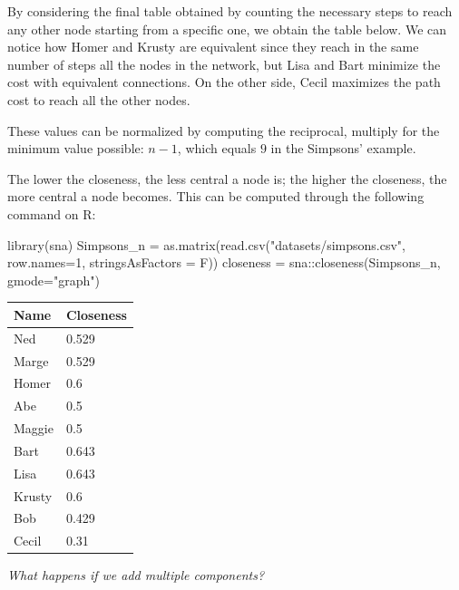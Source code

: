 \documentclass[
  notitlepage,
  onecolumn,
  openany]{book}
\newenvironment{Shaded}{\begin{snugshade}}{\end{snugshade}}
\newcommand{\AttributeTok}[1]{\textcolor[rgb]{0.77,0.63,0.00}{#1}}
\newcommand{\DecValTok}[1]{\textcolor[rgb]{0.00,0.00,0.81}{#1}}
\newcommand{\FunctionTok}[1]{\textcolor[rgb]{0.00,0.00,0.00}{#1}}
\newcommand{\NormalTok}[1]{#1}
\newcommand{\OtherTok}[1]{\textcolor[rgb]{0.56,0.35,0.01}{#1}}
\newcommand{\SpecialCharTok}[1]{\textcolor[rgb]{0.00,0.00,0.00}{#1}}
\newcommand{\StringTok}[1]{\textcolor[rgb]{0.31,0.60,0.02}{#1}}
\begin{document}
By considering the final table obtained by counting the necessary steps to reach any other node starting from a specific one, we obtain the table below. We can notice how Homer and Krusty are equivalent since they reach in the same number of steps all the nodes in the network, but Lisa and Bart minimize the cost with equivalent connections. On the other side, Cecil maximizes the path cost to reach all the other nodes.

These values can be normalized by computing the reciprocal, multiply for the minimum value possible: \(n-1\), which equals \(9\) in the Simpsons' example.

The lower the closeness, the less central a node is; the higher the closeness, the more central a node becomes. This can be computed through the following command on R:

\begin{Shaded}
\begin{Highlighting}[]
\FunctionTok{library}\NormalTok{(sna)}
\NormalTok{Simpsons\_n }\OtherTok{=} \FunctionTok{as.matrix}\NormalTok{(}\FunctionTok{read.csv}\NormalTok{(}\StringTok{"datasets/simpsons.csv"}\NormalTok{, }
                                \AttributeTok{row.names=}\DecValTok{1}\NormalTok{, }
                                \AttributeTok{stringsAsFactors =}\NormalTok{ F))}
\NormalTok{closeness }\OtherTok{=}\NormalTok{ sna}\SpecialCharTok{::}\FunctionTok{closeness}\NormalTok{(Simpsons\_n, }\AttributeTok{gmode=}\StringTok{"graph"}\NormalTok{)}
\end{Highlighting}
\end{Shaded}

\begin{table}
\centering
\begin{tabular}[t]{ll}
\toprule
Name & Closeness\\
\midrule
Ned & 0.529\\
Marge & 0.529\\
Homer & 0.6\\
Abe & 0.5\\
Maggie & 0.5\\
\addlinespace
Bart & 0.643\\
Lisa & 0.643\\
Krusty & 0.6\\
Bob & 0.429\\
Cecil & 0.31\\
\bottomrule
\end{tabular}
\end{table}

\emph{What happens if we add multiple components?}
\end{document}
